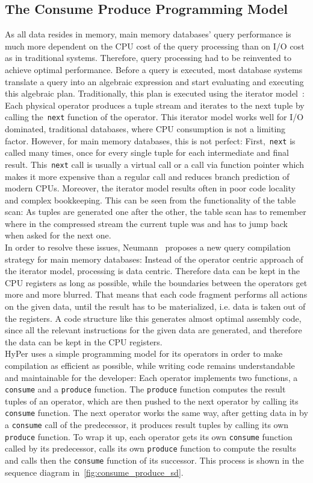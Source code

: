 \subsection{The Consume Produce Programming Model}
As all data resides in memory, main memory databases' query performance is much more dependent on the CPU cost of the query processing than on I/O cost as in traditional systems. Therefore, query processing had to be reinvented to achieve optimal performance.
Before a query is executed, most database systems translate a query into an algebraic expression and start evaluating and executing this algebraic plan. Traditionally, this plan is executed using the iterator model~\parencite{iterator}: Each physical operator produces a tuple stream and iterates to the next tuple by calling the~\texttt{next} function of the operator. This iterator model works well for I/O dominated, traditional databases, where CPU consumption is not a limiting factor. However, for main memory databases, this is not perfect: First,~\texttt{next} is called many times, once for every single tuple for each intermediate and final result. This~\texttt{next} call is usually a virtual call or a call via function pointer which makes it more expensive than a regular call and reduces branch prediction of modern CPUs. Moreover, the iterator model results often in poor code locality and complex bookkeeping. This can be seen from the functionality of the table scan: As tuples are generated one after the other, the table scan has to remember where in the compressed stream the current tuple was and has to jump back when asked for the next one. 
\\
In order to resolve these issues, Neumann~\parencite{neumann} proposes a new query compilation strategy for main memory databases: Instead of the operator centric approach of the iterator model, processing is data centric. Therefore data can be kept in the CPU registers as long as possible, while the boundaries between the operators get more and more blurred. That means that each code fragment performs all actions on the given data, until the result has to be materialized, i.e. data is taken out of the registers. A code structure like this generates almost optimal assembly code, since all the relevant instructions for the given data are generated, and therefore the data can be kept in the CPU registers.
\\
HyPer uses a simple programming model for its operators in order to make  compilation as efficient as possible, while writing code remains understandable and maintainable for the developer: Each operator implements two functions, a \texttt{consume} and a \texttt{produce} function. The \texttt{produce} function computes the result tuples of an operator, which are then pushed to the next operator by calling its \texttt{consume} function. The next operator works the same way, after getting data in by a \texttt{consume} call of the predecessor, it produces result tuples by calling its own \texttt{produce} function. To wrap it up, each operator gets its own \texttt{consume} function called by its predecessor, calls its own \texttt{produce} function to compute the results and calls then the \texttt{consume} function of its successor. This process is shown in the sequence diagram in~\autoref{fig:consume_produce_sd}.



